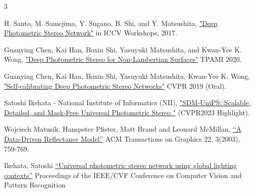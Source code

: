 \begin{thebibliography}{3}

 H. Santo, M. Samejima, Y. Sugano, B. Shi, and Y. Matsushita,  \href{https://openaccess.thecvf.com/content_ICCV_2017_workshops/papers/w9/Santo_Deep_Photometric_Stereo_ICCV_2017_paper.pdf}{"Deep Photometric Stereo Network"} in ICCV Workshops, 2017.

Guanying Chen, Kai Han, Boxin Shi, Yasuyuki Matsushita, and Kwan-Yee K. Wong, \href{ https://arxiv.org/abs/2007.13145v1} {"Deep Photometric Stereo for Non-Lambertian Surfaces"} TPAMI 2020.

Guanying Chen, Kai Han, Boxin Shi, Yasuyuki Matsushita, Kwan-Yee K. Wong, \href{https://openaccess.thecvf.com/content_CVPR_2019/papers/Chen_Self-Calibrating_Deep_Photometric_Stereo_Networks_CVPR_2019_paper.pdf}{"Self-calibrating Deep Photometric Stereo Networks"} CVPR 2019 (Oral).

Satoshi Ikehata -
National Institute of Informatics (NII), \href{https://openaccess.thecvf.com/content_CVPR_2019/papers/Chen_Self-Calibrating_Deep_Photometric_Stereo_Networks_CVPR_2019_paper.pdf}{"SDM-UniPS: Scalable, Detailed, and Mask-Free Universal Photometric Stereo "} (CVPR2023 Highlight).

Wojciech Matusik, Hanspeter Pfister, Matt Brand and Leonard McMillan, \href{https://cdfg.csail.mit.edu/wojciech/brdfdatabase}{“A Data-Driven Reflectance Model”} ACM Transactions on Graphics 22, 3(2003), 759-769.

Ikehata, Satoshi \href{https://openaccess.thecvf.com/content/CVPR2022/papers/Ikehata_Universal_Photometric_Stereo_Network_Using_Global_Lighting_Contexts_CVPR_2022_paper.pdf}{“Universal photometric stereo network using global lighting contexts”} Proceedings of the IEEE/CVF Conference on Computer Vision and Pattern Recognition


\end{thebibliography}
